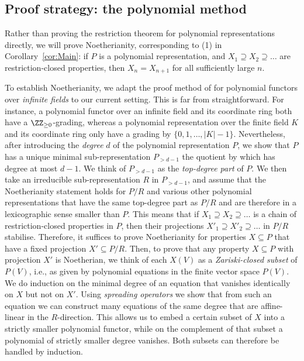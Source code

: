 \documentclass{amsart}
\begin{document}
\subsection{Proof strategy: the polynomial method}

Rather than proving the restriction theorem for polynomial representations
directly, we will prove Noetherianity, corresponding to (1) in
Corollary~\ref{cor:Main}: if $P$ is a polynomial representation, and $X_1
\supseteq X_2 \supseteq \ldots$ are restriction-closed properties, then
$X_n=X_{n+1}$ for all sufficiently large $n$. 

To establish Noetherianity, we adapt the proof method of
\cite{Draisma17} for polynomial functors over {\em infinite fields} to our
current setting. This is far from straightforward. For instance, a
polynomial functor over an infinite field and its
coordinate ring both have a $\ZZ_{\geq
0}$-grading, whereas a polynomial representation over the
finite field $K$ and its
coordinate ring only have a grading by
$\{0,1,\ldots,|K|-1\}$. Nevertheless, after introducing the {\em degree}
$d$ of the polynomial representation $P$, we show that $P$ has a unique
minimal sub-representation $P_{>d-1}$ the quotient by which has degree
at most $d-1$. We think of $P_{>d-1}$ as the {\em top-degree part} of
$P$. We then take an irreducible sub-representation $R$ in $P_{>d-1}$, and
assume that the Noetherianity statement holds for $P/R$ and various other
polynomial representations that have the same top-degree part as $P/R$ and
are therefore in a lexicographic sense smaller than $P$. This means that
if $X_1 \supseteq X_2 \supseteq \ldots$ is a chain of restriction-closed
properties in $P$, then their projections $X'_1 \supseteq X'_2 \supseteq
\ldots$ in $P/R$ stabilise. Therefore, it suffices to prove Noetherianity
for properties $X \subseteq P$ that have a fixed projection $X' \subseteq
P/R$. Then, to prove that any property $X \subseteq P$ with projection
$X'$ is Noetherian, we think of each $X(V)$ as a {\em Zariski-closed
subset} of $P(V)$, i.e., as given by polynomial equations in the finite
vector space $P(V)$. We do induction on the minimal degree of an equation
that vanishes identically on $X$ but not on $X'$. Using {\em spreading operators}
we show that from such an equation we can construct many equations of
the same degree that are affine-linear in the $R$-direction. This allows
us to embed a certain subset of $X$ into a strictly smaller polynomial
functor, while on the complement of that subset a polynomial of strictly
smaller degree vanishes. Both subsets can therefore be
handled by induction.
\end{document}
